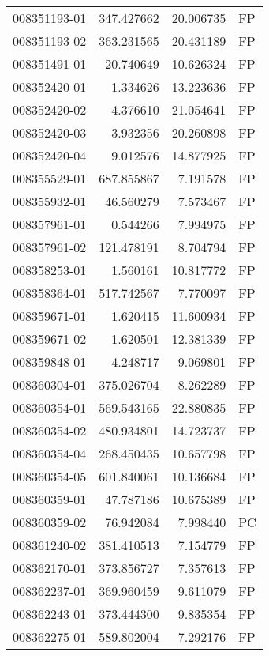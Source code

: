 \begin{tabular}{lrrl}
008351193-01 &  347.427662 &      20.006735 &   FP \\
008351193-02 &  363.231565 &      20.431189 &   FP \\
008351491-01 &   20.740649 &      10.626324 &   FP \\
008352420-01 &    1.334626 &      13.223636 &   FP \\
008352420-02 &    4.376610 &      21.054641 &   FP \\
008352420-03 &    3.932356 &      20.260898 &   FP \\
008352420-04 &    9.012576 &      14.877925 &   FP \\
008355529-01 &  687.855867 &       7.191578 &   FP \\
008355932-01 &   46.560279 &       7.573467 &   FP \\
008357961-01 &    0.544266 &       7.994975 &   FP \\
008357961-02 &  121.478191 &       8.704794 &   FP \\
008358253-01 &    1.560161 &      10.817772 &   FP \\
008358364-01 &  517.742567 &       7.770097 &   FP \\
008359671-01 &    1.620415 &      11.600934 &   FP \\
008359671-02 &    1.620501 &      12.381339 &   FP \\
008359848-01 &    4.248717 &       9.069801 &   FP \\
008360304-01 &  375.026704 &       8.262289 &   FP \\
008360354-01 &  569.543165 &      22.880835 &   FP \\
008360354-02 &  480.934801 &      14.723737 &   FP \\
008360354-04 &  268.450435 &      10.657798 &   FP \\
008360354-05 &  601.840061 &      10.136684 &   FP \\
008360359-01 &   47.787186 &      10.675389 &   FP \\
008360359-02 &   76.942084 &       7.998440 &   PC \\
008361240-02 &  381.410513 &       7.154779 &   FP \\
008362170-01 &  373.856727 &       7.357613 &   FP \\
008362237-01 &  369.960459 &       9.611079 &   FP \\
008362243-01 &  373.444300 &       9.835354 &   FP \\
008362275-01 &  589.802004 &       7.292176 &   FP \\

\end{tabular}
